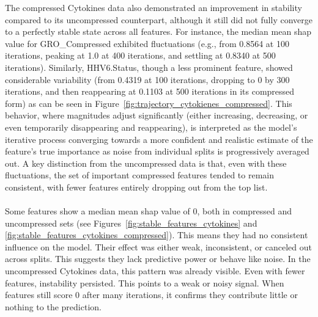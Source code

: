 \documentclass[12pt,a4paper]{report}
\begin{document}
The compressed Cytokines data also demonstrated an improvement in stability compared to its uncompressed counterpart, although it still did not fully converge to a perfectly stable state across all features. For instance, the median mean \gls{shap} value for GRO\_Compressed exhibited fluctuations (e.g., from 0.8564 at 100 iterations, peaking at 1.0 at 400 iterations, and settling at 0.8340 at 500 iterations). Similarly, HHV6.Status, though a less prominent feature, showed considerable variability (from 0.4319 at 100 iterations, dropping to 0 by 300 iterations, and then reappearing at 0.1103 at 500 iterations in its compressed form) as can be seen in Figure~\ref{fig:trajectory_cytokienes_compressed}. This behavior, where magnitudes adjust significantly (either increasing, decreasing, or even temporarily disappearing and reappearing), is interpreted as the model's iterative process converging towards a more confident and realistic estimate of the feature's true importance as noise from individual splits is progressively averaged out. A key distinction from the uncompressed data is that, even with these fluctuations, the set of important compressed features tended to remain consistent, with fewer features entirely dropping out from the top list.\\
\\
Some features show a median mean \gls{shap} value of 0, both in compressed and uncompressed sets (see Figures~\ref{fig:stable_features_cytokines} and \ref{fig:stable_features_cytokines_compressed}). This means they had no consistent influence on the model. Their effect was either weak, inconsistent, or canceled out across splits. This suggests they lack predictive power or behave like noise. In the uncompressed Cytokines data, this pattern was already visible. Even with fewer features, instability persisted. This points to a weak or noisy signal. When features still score 0 after many iterations, it confirms they contribute little or nothing to the prediction.\\
\\
\end{document}
